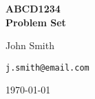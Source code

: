 \documentclass[11pt,a4paper]{article}
\makeatletter
\newcommand{\code}[1]{\texttt{#1}}
\newcommand{\studentname}{John Smith}
\newcommand{\studentemail}{j.smith@email.com}
\newcommand{\coursecode}{ABCD1234}
\newcommand{\assignmentname}{Problem Set}
\makeatother
\begin{document}
\begin{titlepage}
    \centering
    \vspace*{3cm}
    {\Huge \textbf{\coursecode\\\assignmentname} \par}
    \vspace{2cm}
    {\Large \studentname\par}
    {\large \code{\studentemail}\par}
    \vfill
    {\large \monthyear\today}
\end{titlepage}

\end{document}
